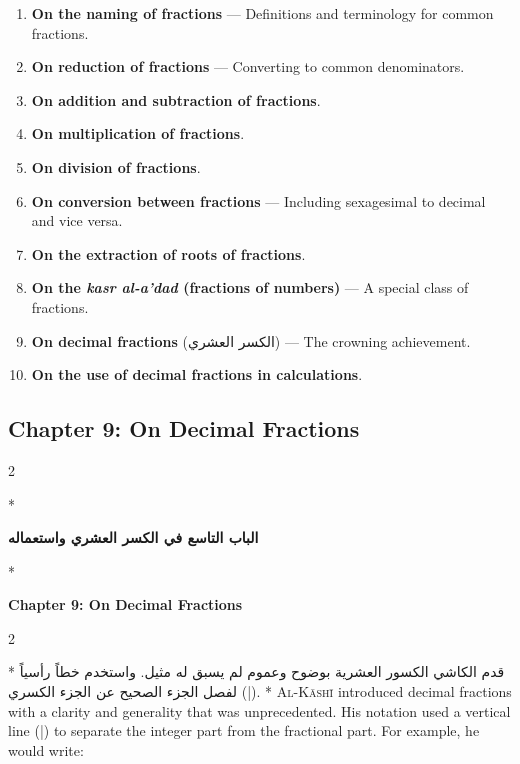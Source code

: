 \documentclass[11pt,a4paper]{article}
\newcommand{\ar}[1]{\arabicfont\beginR #1\endR}
\newenvironment{bilingual}{%
  \vspace{0.3em}%
  \begin{paracol}{2}%
}{%
  \end{paracol}%
  \vspace{0.3em}%
}
\begin{document}
\begin{enumerate}[label=\textbf{Ch.\arabic*:}]
  \item \textbf{On the naming of fractions} --- Definitions and
  terminology for common fractions.
  \item \textbf{On reduction of fractions} --- Converting to common
  denominators.
  \item \textbf{On addition and subtraction of fractions}.
  \item \textbf{On multiplication of fractions}.
  \item \textbf{On division of fractions}.
  \item \textbf{On conversion between fractions} --- Including sexagesimal
  to decimal and vice versa.
  \item \textbf{On the extraction of roots of fractions}.
  \item \textbf{On the \textit{kasr al-a'dad} (fractions of numbers)} ---
  A special class of fractions.
  \item \textbf{On decimal fractions} (\ar{الكسر العشري}) --- The
  crowning achievement.
  \item \textbf{On the use of decimal fractions in calculations}.
\end{enumerate}

\subsection{Chapter 9: On Decimal Fractions}

\begin{bilingual}
\switchcolumn[0]*
\begin{center}
\textbf{\color{chapcolor}\ar{الباب التاسع في الكسر العشري واستعماله}}
\end{center}
\switchcolumn[1]*
\begin{center}
\textbf{\color{chapcolor}Chapter 9: On Decimal Fractions}
\end{center}
\end{bilingual}

\begin{bilingual}
\switchcolumn[0]*
\ar{قدم الكاشي الكسور العشرية بوضوح وعموم لم يسبق له مثيل. واستخدم خطاً رأسياً (|) لفصل الجزء الصحيح عن الجزء الكسري.}
\switchcolumn[1]*
\lettrine[lines=3, nindent=0em, findent=3pt]{\color{chapcolor}A}{l-K\=ash\=i}
introduced decimal fractions with a clarity and generality that was
unprecedented. His notation used a vertical line (\ar{|}) to separate
the integer part from the fractional part. For example, he would write:
\end{bilingual}
\end{document}
